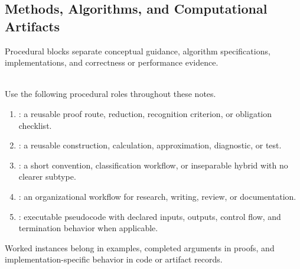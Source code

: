 \subsection{Methods, Algorithms, and Computational Artifacts}

Procedural blocks separate conceptual guidance, algorithm specifications, implementations, and correctness or performance evidence.

\begin{convention} \label{conv:procedural-environment-roles} \\
Use the following procedural roles throughout these notes.
\begin{enumerate}[label=(\roman*)]
\setlength{\itemsep}{0pt}
\item {}: a reusable proof route, reduction, recognition criterion, or obligation checklist.
\item {}: a reusable construction, calculation, approximation, diagnostic, or test.
\item {}: a short convention, classification workflow, or inseparable hybrid with no clearer subtype.
\item {}: an organizational workflow for research, writing, review, or documentation.
\item {}: executable pseudocode with declared inputs, outputs, control flow, and termination behavior when applicable.
\end{enumerate}
Worked instances belong in examples, completed arguments in proofs, and implementation-specific behavior in code or artifact records.
\end{convention}

